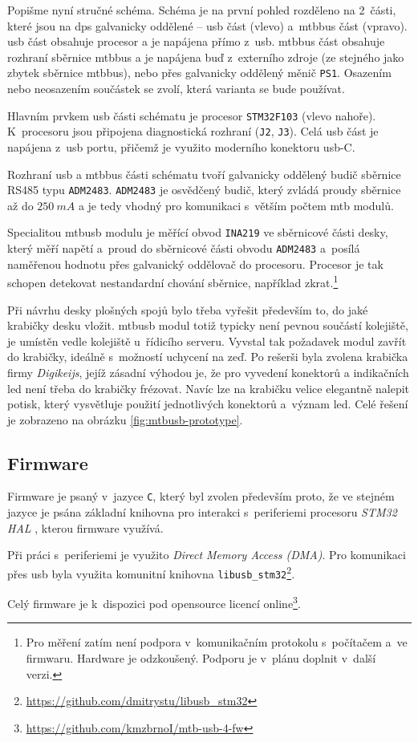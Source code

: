 Popišme nyní stručné schéma. Schéma je na první pohled rozděleno na 2~části,
které jsou na \gls{dps} galvanicky oddělené –
\gls{usb} část (vlevo) a~\gls{mtbbus} část (vpravo). \gls{usb} část obsahuje
procesor a je napájena přímo z~\gls{usb}. \gls{mtbbus} část obsahuje rozhraní
sběrnice \gls{mtbbus} a je napájena buď z~externího zdroje (ze stejného jako
zbytek sběrnice \gls{mtbbus}), nebo přes galvanicky oddělený měnič \texttt{PS1}.
Osazením nebo neosazením součástek se zvolí, která varianta se bude používat.

Hlavním prvkem \gls{usb} části schématu je procesor
\texttt{STM32F103} (vlevo nahoře). K~procesoru jsou připojena diagnostická
rozhraní (\texttt{J2}, \texttt{J3}). Celá \gls{usb} část je napájena z~\gls{usb}
portu, přičemž je využito moderního konektoru \gls{usb}-C.

Rozhraní \gls{usb} a \gls{mtbbus} části schématu tvoří galvanicky oddělený
budič sběrnice RS485 typu \texttt{ADM2483}. \texttt{ADM2483} je osvědčený budič,
který zvládá proudy sběrnice až do $250~mA$ \cite{adm2483-datasheet} a je tedy
vhodný pro komunikaci s~větším počtem \gls{mtb} modulů.

Specialitou \gls{mtbusb} modulu je měřící obvod \texttt{INA219} ve sběrnicové
části desky, který měří napětí a~proud do sběrnicové části obvodu
\texttt{ADM2483} a~posílá naměřenou hodnotu přes galvanický oddělovač do
procesoru. Procesor je tak schopen detekovat nestandardní chování sběrnice,
například zkrat.\footnote{Pro měření zatím není podpora v~komunikačním
protokolu s~počítačem a~ve firmwaru. Hardware je odzkoušený. Podporu je v~plánu
doplnit v~další verzi.}

Při návrhu desky plošných spojů bylo třeba vyřešit především to, do jaké
krabičky desku vložit. \gls{mtbusb} modul totiž typicky není pevnou součástí
kolejiště, je umístěn vedle kolejiště u~řídicího serveru. Vyvstal tak požadavek
modul zavřít do krabičky, ideálně s~možností uchycení na zeď. Po rešerši byla
zvolena krabička firmy \textit{Digikeijs}, jejíž zásadní výhodou je, že pro
vyvedení konektorů a indikačních \gls{led} není třeba do krabičky frézovat. Navíc lze
na krabičku velice elegantně nalepit potisk, který vysvětluje použití
jednotlivých konektorů a~význam \gls{led}. Celé řešení je zobrazeno na
obrázku \ref{fig:mtbusb-prototype}.


\subsection{Firmware}

Firmware je psaný v~jazyce \texttt{C}, který byl zvolen především proto, že ve
stejném jazyce je psána základní knihovna pro interakci s~periferiemi procesoru
\textit{STM32 HAL} \cite{stm32-hal}, kterou firmware využívá.

Při práci s~periferiemi je využito \textit{Direct Memory Access (DMA)}. Pro
komunikaci přes \gls{usb} byla využita komunitní knihovna
\texttt{libusb\_stm32}\footnote{\url{https://github.com/dmitrystu/libusb_stm32}}.

Celý firmware je k~dispozici pod opensource licencí
online\footnote{\url{https://github.com/kmzbrnoI/mtb-usb-4-fw}}.
